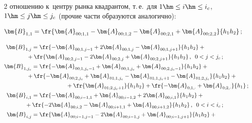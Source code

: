 \begin{multicols}{2}
отношению к~центру рынка квадрантом, т.\,е.\ для $1 \hm\leq i \hm\leq i_c$, $1 


\hm\leq j \hm\leq j_c$ (прочие части образуются аналогично):


  \begin{align*}


  \bm{B}_{1,1}&=\fr{\bm{A}_{00;1,1} - \bm{A}_{00;1,2} - \bm{A}_{00;2,1} + 


\bm{A}_{00;2,2}}{h_1h_2}\,; 


\end{align*}





  \noindent


  \begin{align*}


  \bm{B}_{1,j}&=\fr{-\bm{A}_{00;1,j-1} + 2\bm{A}_{00;1,j} - \bm{A}_{00;1,j+1}}{h_1h_2} + {}\\


&\hspace*{-3mm}{}+


\fr{\bm{A}_{00;2,j-1} - 2\bm{A}_{00;2,j} + \bm{A}_{00;2,j+1}}{h_1h_2}\,,\enskip 0<j<j_c\,; \\


  \bm{B}_{1,j_c}&=\fr{- \bm{A}_{00;1,j_c-1} + \bm{A}_{00;1,j_c} + \bm{A}_{00;2,j_c - 1}}{h_1h_2} +{}\\


  &\hspace*{-3mm}{}+  


  \fr{- \bm{A}_{00;2,j_c} + \bm{A}_{01;1,j_c} - \bm{A}_{01;1,j_c+1} - \bm{A}_{01;2,j_c} }{h_1h_2}+{}\\


&\hspace*{21mm}{}+ \fr{\bm{A}_{01;2,j_c+1}}{h_1h_2} + \fr{- \bm{A}_{0;1,\cdot} + \bm{A}_{0;2,\cdot}}{h_1}\,; \\


  \bm{B}_{i,1}&=\fr{-\bm{A}_{00;i-1,1} + \bm{A}_{00;i-1,2} + 2\bm{A}_{00;i,1}}{h_1h_2}+{}\\


  &\hspace*{-4mm}{}+ \fr{ -  2\bm{A}_{00;i,2} - \bm{A}_{00;i+1,1} + \bm{A}_{00;i+1,2}}{h_1h_2}\,,\enskip   0<i<i_c\,; \\


  \bm{B}_{i,j}&= \fr{\bm{A}_{00;i-1,j-1} - 2\bm{A}_{00;i-1,j} + \bm{A}_{00;i-1,j+1}}{h_1h_2}+{}\\



\end{align*}
\end{multicols}
